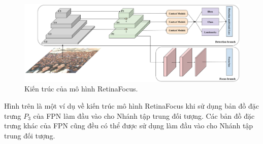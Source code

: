 {    \begin{figure}[H]
        \centering
        \includegraphics[width=15cm] {images/retinafocus_architecture}
        \caption{Kiến trúc của mô hình RetinaFocus.}
        \label{fig:retinafocus_architecture}
    \end{figure}

    \noindent
    Hình trên là một ví dụ về kiến trúc mô hình RetinaFocus khi sử dụng bản đồ đặc trưng $P_3$ của FPN làm đầu vào cho Nhánh tập trung đối tượng.
    Các bản đồ đặc trưng khác của FPN cũng đều có thể được sử dụng làm đầu vào cho Nhánh tập trung đối tượng.
}